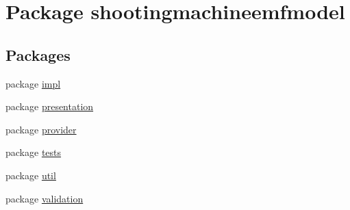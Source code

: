 \hypertarget{namespaceshootingmachineemfmodel}{\section{Package shootingmachineemfmodel}
\label{namespaceshootingmachineemfmodel}
}
\subsection*{Packages}
\begin{DoxyCompactItemize}
\item 
package \hyperlink{namespaceshootingmachineemfmodel_1_1impl}{impl}
\item 
package \hyperlink{namespaceshootingmachineemfmodel_1_1presentation}{presentation}
\item 
package \hyperlink{namespaceshootingmachineemfmodel_1_1provider}{provider}
\item 
package \hyperlink{namespaceshootingmachineemfmodel_1_1tests}{tests}
\item 
package \hyperlink{namespaceshootingmachineemfmodel_1_1util}{util}
\item 
package \hyperlink{namespaceshootingmachineemfmodel_1_1validation}{validation}
\end{DoxyCompactItemize}
